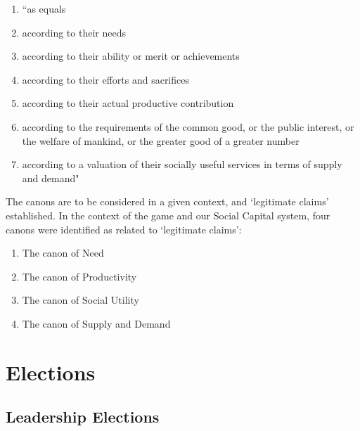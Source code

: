 \begin{enumerate}
    \item ``as equals
    \item according to their needs
    \item according to their ability or merit or achievements
    \item according to their efforts and sacrifices
    \item according to their actual productive contribution
    \item according to the requirements of the common good, or the public interest, or the welfare of mankind, or the greater good of a greater number
    \item according to a valuation of their socially useful services in terms of supply and demand" \cite{rescher1966}
\end{enumerate}

The canons are to be considered in a given context, and `legitimate claims' established. In the context of the game and our Social Capital system, four canons were identified as related to `legitimate claims':

\begin{enumerate}
    \item The canon of Need
    \item The canon of Productivity
    \item The canon of Social Utility
    \item The canon of Supply and Demand
\end{enumerate}

\section{Elections}

\subsection{Leadership Elections}

